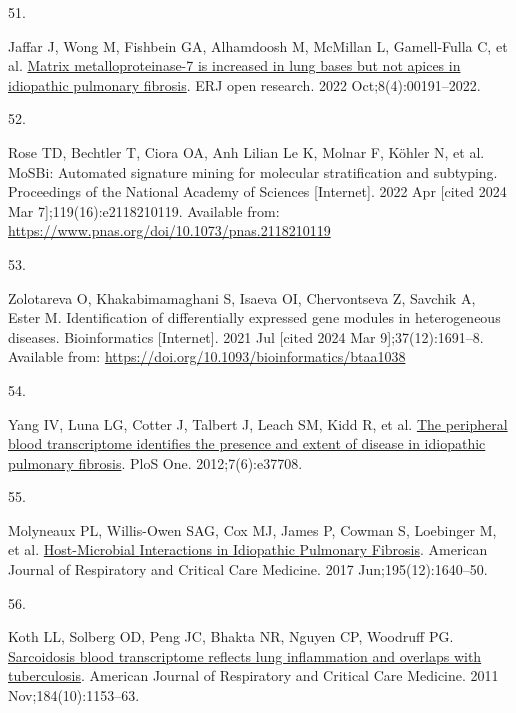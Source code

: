 \documentclass[
]{article}
\newlength{\cslhangindent}
\newlength{\csllabelwidth}
\newlength{\cslentryspacingunit} %
\newenvironment{CSLReferences}[2] %
 {%
  \setlength{\parindent}{0pt}
  \ifodd #1
  \let\oldpar\par
  \def\par{\hangindent=\cslhangindent\oldpar}
  \fi
  \setlength{\parskip}{#2\cslentryspacingunit}
 }%
 {}
\newcommand{\CSLLeftMargin}[1]{\parbox[t]{\csllabelwidth}{#1}}
\newcommand{\CSLRightInline}[1]{\parbox[t]{\linewidth - \csllabelwidth}{#1}\break}
\begin{document}
\begin{CSLReferences}{0}{0}
\leavevmode{}%
\CSLLeftMargin{51. }%
\CSLRightInline{Jaffar J, Wong M, Fishbein GA, Alhamdoosh M, McMillan L, Gamell-Fulla C, et al. \href{https://doi.org/10.1183/23120541.00191-2022}{Matrix metalloproteinase-7 is increased in lung bases but not apices in idiopathic pulmonary fibrosis}. ERJ open research. 2022 Oct;8(4):00191--2022. }

\leavevmode{}%
\CSLLeftMargin{52. }%
\CSLRightInline{Rose TD, Bechtler T, Ciora OA, Anh Lilian Le K, Molnar F, Köhler N, et al. {MoSBi}: {Automated} signature mining for molecular stratification and subtyping. Proceedings of the National Academy of Sciences {[}Internet{]}. 2022 Apr {[}cited 2024 Mar 7{]};119(16):e2118210119. Available from: \url{https://www.pnas.org/doi/10.1073/pnas.2118210119}}

\leavevmode{}%
\CSLLeftMargin{53. }%
\CSLRightInline{Zolotareva O, Khakabimamaghani S, Isaeva OI, Chervontseva Z, Savchik A, Ester M. Identification of differentially expressed gene modules in heterogeneous diseases. Bioinformatics {[}Internet{]}. 2021 Jul {[}cited 2024 Mar 9{]};37(12):1691--8. Available from: \url{https://doi.org/10.1093/bioinformatics/btaa1038}}

\leavevmode{}%
\CSLLeftMargin{54. }%
\CSLRightInline{Yang IV, Luna LG, Cotter J, Talbert J, Leach SM, Kidd R, et al. \href{https://doi.org/10.1371/journal.pone.0037708}{The peripheral blood transcriptome identifies the presence and extent of disease in idiopathic pulmonary fibrosis}. PloS One. 2012;7(6):e37708. }

\leavevmode{}%
\CSLLeftMargin{55. }%
\CSLRightInline{Molyneaux PL, Willis-Owen SAG, Cox MJ, James P, Cowman S, Loebinger M, et al. \href{https://doi.org/10.1164/rccm.201607-1408OC}{Host-{Microbial} {Interactions} in {Idiopathic} {Pulmonary} {Fibrosis}}. American Journal of Respiratory and Critical Care Medicine. 2017 Jun;195(12):1640--50. }

\leavevmode{}%
\CSLLeftMargin{56. }%
\CSLRightInline{Koth LL, Solberg OD, Peng JC, Bhakta NR, Nguyen CP, Woodruff PG. \href{https://doi.org/10.1164/rccm.201106-1143OC}{Sarcoidosis blood transcriptome reflects lung inflammation and overlaps with tuberculosis}. American Journal of Respiratory and Critical Care Medicine. 2011 Nov;184(10):1153--63. }


\end{CSLReferences}
\end{document}
